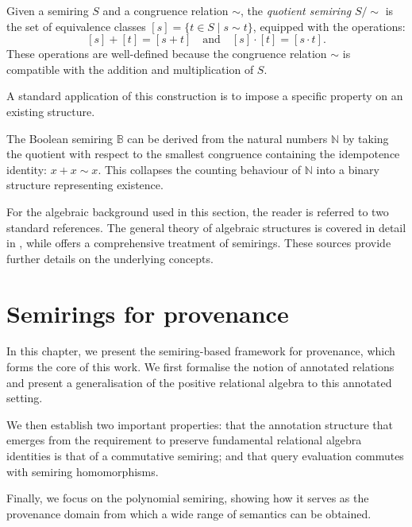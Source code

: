\documentclass[oneside, 11pt]{amsbook}
\theoremstyle{plain}
\theoremstyle{definition}
\theoremstyle{remark}
\begin{document}
\begin{defn}
    Given a semiring $S$ and a congruence relation $\sim$, the \emph{quotient semiring} $S/\!\!\sim$ is the set of equivalence classes $[s] = \{ t \in S \mid s \sim t \}$, equipped with the operations:
    \[
        [s] + [t] = [s + t] \quad \text{and} \quad [s] \cdot [t] = [s \cdot t].
    \]
    These operations are well-defined because the congruence relation $\sim$ is compatible with the addition and multiplication of $S$.
\end{defn}

A standard application of this construction is to impose a specific property on an existing structure.

\begin{exmpl}
    The Boolean semiring $\mathbb{B}$ can be derived from the natural numbers $\mathbb{N}$ by taking the quotient with respect to the smallest congruence containing the idempotence identity: $x + x \sim x$. This collapses the counting behaviour of $\mathbb{N}$ into a binary structure representing existence.
\end{exmpl}

For the algebraic background used in this section, the reader is referred to two standard references. The general theory of algebraic structures is covered in detail in \cite{Lang2002}, while \cite{Golan1999} offers a comprehensive treatment of semirings. These sources provide further details on the underlying concepts.

\chapter{Semirings for provenance}
\label{chapter:semirings}

In this chapter, we present the semiring-based framework for provenance, which forms the core of this work. We first formalise the notion of annotated relations and present a generalisation of the positive relational algebra to this annotated setting.

We then establish two important properties: that the annotation structure that emerges from the requirement to preserve fundamental relational algebra identities is that of a commutative semiring; and that query evaluation commutes with semiring homomorphisms.

Finally, we focus on the polynomial semiring, showing how it serves as the provenance domain from which a wide range of semantics can be obtained.
\end{document}
